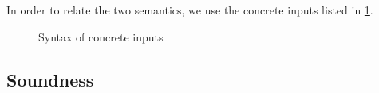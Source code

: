 %
%
%
%
%

In order to relate the two semantics, we use the concrete inputs listed in \cref{fig:inputsConcrete}.

\begin{figure}[h]
  \caption{Syntax of concrete inputs}
  \label{fig:inputsConcrete}
\end{figure}


\subsection{Soundness}
\label{sec:soundess}






